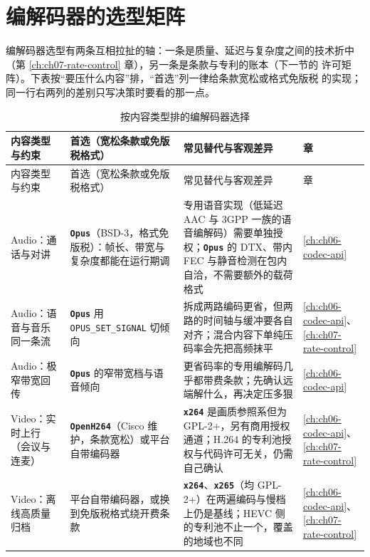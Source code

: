 \documentclass[12pt,a4paper,fontset=fandol]{ctexbook}
\newcommand{\Tp}[1]{\texttt{#1}}
\newcommand{\Bk}{\discretionary{}{}{}}
\newcommand{\Lib}[1]{\textbf{\texttt{#1}}}
\newcommand{\Lang}[1]{\textsf{#1}}
\newcommand{\DomAud}{\Lang{Audio}}
\newcommand{\DomVid}{\Lang{Video}}
\begin{document}
\section{编解码器的选型矩阵}

编解码器选型有两条互相拉扯的轴：一条是质量、延迟与复杂度之间的技术折中
（第 \ref{ch:ch07-rate-control} 章），另一条是条款与专利的账本（下一节的
许可矩阵）。下表按``要压什么内容''排，``首选''列一律给条款宽松或格式免版税
的实现；同一行右两列的差别只写决策时要看的那一点。

\small
\begin{longtable}{>{\raggedright\arraybackslash}p{}
                  >{\raggedright\arraybackslash}p{}
                  >{\raggedright\arraybackslash}p{}
                  >{\raggedright\arraybackslash}p{}}
\caption{按内容类型排的编解码器选择}\label{tab:apC-codec} \\
\toprule
内容类型与约束 & 首选（宽松条款或免版税格式） & 常见替代与客观差异 & 章 \\
\midrule
\endfirsthead
\toprule
内容类型与约束 & 首选（宽松条款或免版税格式） & 常见替代与客观差异 & 章 \\
\midrule
\endhead
\midrule
\endfoot
\bottomrule
\endlastfoot
\DomAud{}：通话与对讲 & \Lib{Opus}（BSD-3，格式免版税）：帧长、带宽与复杂度都能在运行期调 & 专用语音实现（低延迟 AAC 与 3GPP 一族的语音编解码）需要单独授权；\Lib{Opus} 的 DTX、带内 FEC 与静音检测在包内自洽，不需要额外的载荷格式 & \ref{ch:ch06-codec-api} \\
\DomAud{}：语音与音乐同一条流 & \Lib{Opus} 用 \Tp{OPUS\Bk\_SET\Bk\_SIGNAL} 切倾向 & 拆成两路编码更省，但两路的时间轴与缓冲要各自对齐；混合内容下单纯压码率会先把高频抹平 & \ref{ch:ch06-codec-api}、\ref{ch:ch07-rate-control} \\
\DomAud{}：极窄带宽回传 & \Lib{Opus} 的窄带宽档与语音倾向 & 更省码率的专用编解码几乎都带费条款；先确认远端解什么，再决定压多狠 & \ref{ch:ch06-codec-api} \\
\DomVid{}：实时上行（会议与连麦） & \Lib{OpenH264}（Cisco 维护，条款宽松）或平台自带编码器 & \Lib{x264} 是画质参照系但为 GPL-2+，另有商用授权通道；H.264 的专利池授权与代码许可无关，仍需自己确认 & \ref{ch:ch06-codec-api}、\ref{ch:ch07-rate-control} \\
\DomVid{}：离线高质量归档 & 平台自带编码器，或换到免版税格式绕开费条款 & \Lib{x264}、\Lib{x265}（均 GPL-2+）在两遍编码与慢档上仍是基线；HEVC 侧的专利池不止一个，覆盖的地域也不同 & \ref{ch:ch06-codec-api}、\ref{ch:ch07-rate-control} \\

\end{longtable}
\end{document}
